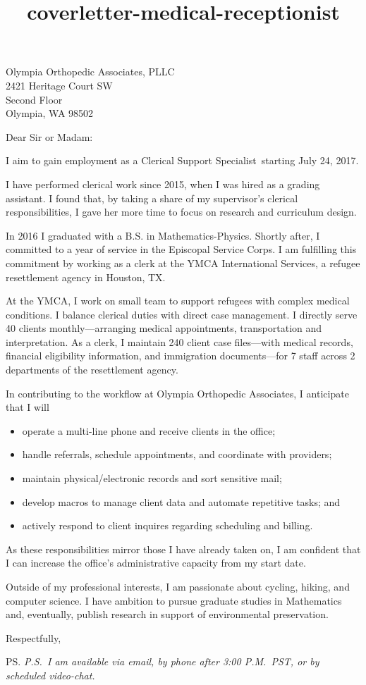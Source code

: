 \documentclass{letter}
\title{coverletter-medical-receptionist}
\newcommand{\jobtitle}{a Clerical Support Specialist}
\newcommand{\company}{Olympia Orthopedic Associates}
\begin{document}
\begin{letter}{Olympia Orthopedic Associates, PLLC \\ 2421 Heritage Court SW \\ Second Floor \\ Olympia, WA 98502}
\opening{Dear Sir or Madam:}

I aim to gain employment as \jobtitle\ starting July 24, 2017.

I have performed clerical work since 2015, when I was hired as a grading assistant. I found that, by taking a share of my supervisor's clerical responsibilities, I gave her more time to focus on research and curriculum design.  

In 2016 I graduated with a B.S. in Mathematics-Physics. Shortly after, I committed to a year of service in the Episcopal Service Corps. I am fulfilling this commitment by working as a clerk at the YMCA International Services, a refugee resettlement agency in Houston, TX. %

At the YMCA, I work on small team to support refugees with complex medical conditions. I balance clerical duties with direct case management. I directly serve 40 clients monthly---arranging medical appointments, transportation and interpretation. %
As a clerk, I maintain 240 client case files---with medical records, financial eligibility information, and immigration documents---for 7 staff across 2 departments of the resettlement agency. 

In contributing to the workflow at \company, I anticipate that I will
\begin{itemize}
	\item operate a multi-line phone and receive clients in the office;
	\item handle referrals, schedule appointments, and coordinate with providers;
	\item maintain physical/electronic records and sort sensitive mail; 
	\item develop macros to manage client data and automate repetitive tasks; and 
	\item actively respond to client inquires regarding scheduling and billing.
\end{itemize}
As these responsibilities mirror those I have already taken on, I am confident that I can increase the office's administrative capacity from my start date.

Outside of my professional interests, I am passionate about cycling, hiking, and computer science. I have ambition to pursue graduate studies in Mathematics and, eventually, publish research in support of environmental preservation. 

\closing{Respectfully,}
\ps
\emph{P.S.\ I am available via email, by phone after 3:00 P.M.\ PST, or by scheduled video-chat.}

\end{letter}
\end{document}
